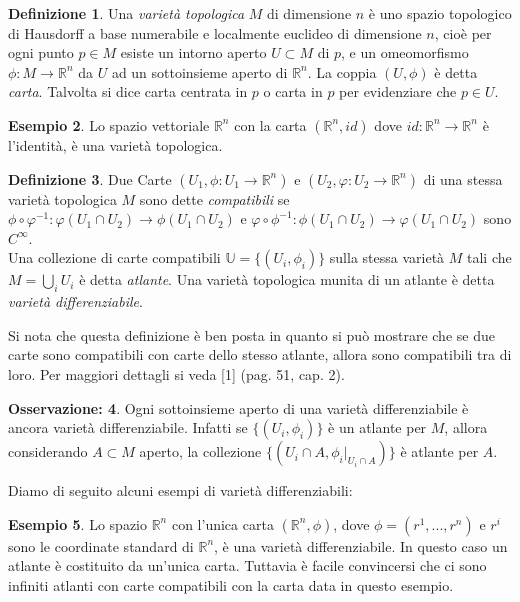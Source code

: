 \documentclass[12pt,a4paper]{report}
\theoremstyle{definition}
\newtheorem{Def}{Definizione}[chapter]
\theoremstyle{Theorem}
\theoremstyle{definition}
\newtheorem{Ex}[Def]{Esempio}
\theoremstyle{definition}
\theoremstyle{definition}
\newtheorem{Obs}[Def]{Osservazione:}
\begin{document}
\begin{Def}
	Una \textit{varietà topologica} $M$ di dimensione $n$ è uno spazio topologico di Hausdorff a base numerabile e localmente euclideo di dimensione $n$, cioè per ogni punto $p\in M$ esiste un intorno aperto $U\subset M$ di $p$, e un omeomorfismo $\phi:M\rightarrow\mathbb{R}^n$ da $U$ ad un sottoinsieme aperto di $\mathbb{R}^n$. La coppia $(U,\phi)$ è detta \textit{carta}. Talvolta si dice carta centrata in $p$ o carta in $p$ per evidenziare che $p\in U$. 
\end{Def}
\begin{Ex}
	Lo spazio vettoriale $\mathbb{R}^n$ con la carta $(\mathbb{R}^n, id)$ dove $id:\mathbb{R}^n\rightarrow \mathbb{R}^n$ è l'identità, è una varietà topologica. 
\end{Ex}
\begin{Def}
	Due Carte $(U_1,\phi:U_1\rightarrow\mathbb{R}^n)$ e $(U_2,\varphi:U_2\rightarrow\mathbb{R}^n)$ di una stessa varietà topologica $M$ sono dette \textit{compatibili} se
	$\phi\circ\varphi^{-1}:\varphi(U_1\cap U_2)\rightarrow \phi(U_1\cap U_2)$ e $\varphi\circ\phi^{-1}:\phi(U_1\cap U_2)\rightarrow \varphi(U_1\cap U_2)$ sono $C^\infty$.\\
	Una collezione di carte compatibili $\mathbb{U}=\{(U_i,\phi_{i})\}$ sulla stessa varietà $M$ tali che $M=\bigcup_i U_i$ è detta \textit{atlante}. Una varietà topologica munita di un atlante è detta \textit{varietà differenziabile}.
\end{Def}
Si nota che questa definizione è ben posta in quanto si può mostrare che se due carte sono compatibili con carte dello stesso atlante, allora sono compatibili tra di loro. Per maggiori dettagli si veda [1] (pag. 51, cap. 2).
\begin{Obs}\label{Obs:1.1.1}
Ogni sottoinsieme aperto di una varietà differenziabile è ancora varietà differenziabile. Infatti se $\{(U_i,\phi_i)\}$ è un atlante per $M$, allora considerando $A\subset M$ aperto, la collezione $\{(U_i\cap A,\phi_i|_{U_i\cap A})\}$ è atlante per $A$.
\end{Obs}
Diamo di seguito alcuni esempi di varietà differenziabili:
\begin{Ex}
	Lo spazio $\mathbb{R}^n$ con l'unica carta $(\mathbb{R}^n,\phi)$, dove $\phi=(r^1,...,r^n)$ e $r^i$ sono le coordinate standard di $\mathbb{R}^n$, è una varietà differenziabile. In questo caso un atlante è costituito da un'unica carta. Tuttavia è facile convincersi che ci sono infiniti atlanti con carte compatibili con la carta data in questo esempio.
\end{Ex}
\end{document}
